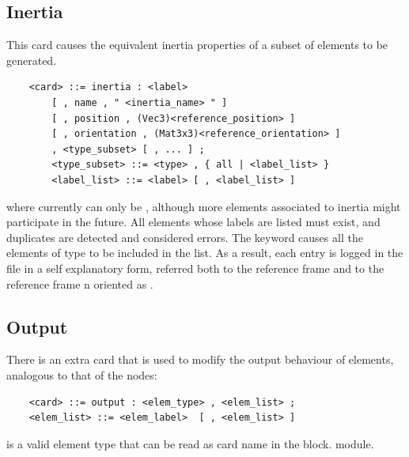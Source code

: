 \subsection{Inertia}
This card causes the equivalent inertia properties of a subset
of elements to be generated.
\begin{verbatim}
    <card> ::= inertia : <label>
        [ , name , " <inertia_name> " ]
        [ , position , (Vec3)<reference_position> ]
        [ , orientation , (Mat3x3)<reference_orientation> ]
        , <type_subset> [ , ... ] ;
        <type_subset> ::= <type> , { all | <label_list> }
        <label_list> ::= <label> [ , <label_list> ]
\end{verbatim}
where  currently can only be , although more elements
associated to inertia might participate in the future.
All elements whose labels are listed must exist, and duplicates
are detected and considered errors.
The keyword  causes all the elements of type  
to be included in the list.
As a result, each  entry is logged in the  file
in a self explanatory form, referred both to the  
reference frame and to the reference frame n 
oriented as .



\subsection{Output}
There is an extra card that is used to modify the output behaviour of 
elements, analogous to that of the nodes:
\begin{verbatim}
    <card> ::= output : <elem_type> , <elem_list> ;
    <elem_list> ::= <elem_label>  [ , <elem_list> ]
\end{verbatim}
 is a valid element type that can be read 
as card name in the  block.
module.





